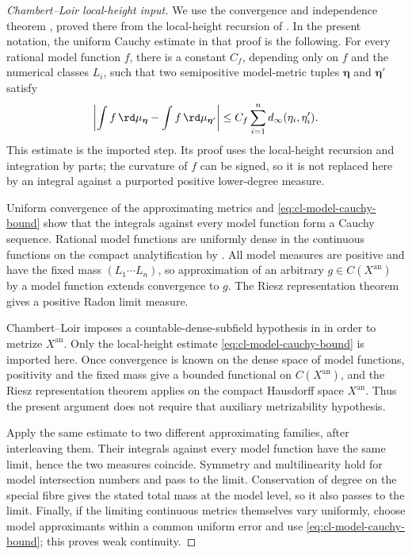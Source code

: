 \begin{proof}[Chambert--Loir local-height input]
We use the convergence and independence theorem
\cite[Proposition~2.7]{CL06}, proved there from the local-height recursion of
\cite[\S\S2.3--2.4]{CL06}.  In the present notation, the uniform Cauchy
estimate in that proof is the
following.  For every rational model function $f$, there is a constant
$C_f$, depending only on $f$ and the numerical classes $L_i$, such
that two semipositive model-metric tuples $\boldsymbol\eta$ and
$\boldsymbol\eta'$ satisfy
\begin{equation}\label{eq:cl-model-cauchy-bound}
 \left|\int f\,\rd\mu_{\boldsymbol\eta}
       -\int f\,\rd\mu_{\boldsymbol\eta'}\right|
 \le C_f\sum_{i=1}^n d_\infty(\eta_i,\eta_i').
\end{equation}
This estimate is the imported step.  Its proof uses the local-height
recursion and integration by parts; the curvature of $f$ can be signed,
so it is not replaced here by an integral against a purported positive
lower-degree measure.

Uniform convergence of the approximating metrics and
\eqref{eq:cl-model-cauchy-bound} show that the integrals against every model
function form a Cauchy sequence.  Rational model functions are uniformly
dense in the continuous functions on the compact analytification by
.  All model measures are positive and have
the fixed mass $(L_1\cdots L_n)$, so approximation of an arbitrary
$g\in C(X^{\mathrm{an}})$ by a model function extends convergence to $g$.
The Riesz representation theorem gives a positive Radon limit measure.

Chambert--Loir imposes a countable-dense-subfield hypothesis in
\cite[\S2]{CL06} in order to metrize $X^{\mathrm{an}}$. Only the
local-height estimate \eqref{eq:cl-model-cauchy-bound} is imported here.
Once convergence is known on the dense space of model functions, positivity
and the fixed mass give a bounded functional on
$C(X^{\mathrm{an}})$, and the Riesz representation theorem applies on the
compact Hausdorff space $X^{\mathrm{an}}$. Thus the present argument does
not require that auxiliary metrizability hypothesis.

Apply the same estimate to two different approximating families, after
interleaving them.  Their integrals against every model function have the
same limit, hence the two measures coincide.  Symmetry and multilinearity
hold for model intersection numbers and pass to the limit.  Conservation of
degree on the special fibre gives the stated total mass at the model level,
so it also passes to the limit.  Finally, if the limiting continuous metrics
themselves vary uniformly, choose model approximants within a common uniform
error and use \eqref{eq:cl-model-cauchy-bound}; this proves weak continuity.

\end{proof}

